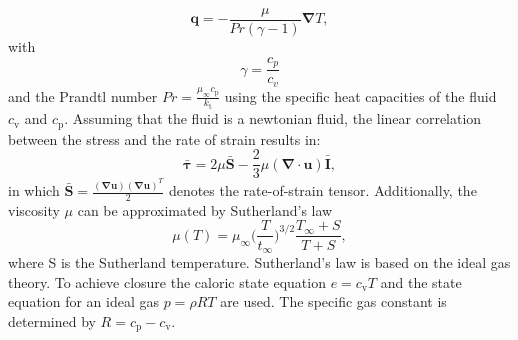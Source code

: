 \documentclass[11pt,a4paper,openany,oneside,parskip=half*]{article}
\renewcommand*\vec[1]{\boldsymbol{#1}}
\renewcommand*\matrix[1]{\boldsymbol{#1}}
\begin{document}
\begin{equation}
 \vec{q} = - \frac{\mu}{Pr (\gamma - 1)} \vec\nabla T,
\end{equation}
with 
\begin{equation}
 \gamma = \frac{c_p}{c_v}
\end{equation}
and the Prandtl number
$ Pr = \frac{\mu_\infty c_\mathrm{p}}{k_\mathrm{t}}$
using the specific heat capacities of the fluid $ c_\mathrm{v} $ and $ c_\mathrm{p} $.
Assuming that the fluid is a newtonian fluid, the linear correlation between the stress and the rate of strain results in:
\begin{equation}
 \matrix{\bar{\tau}} = 2 \mu \matrix{\bar{S}} - \frac{2}{3} \mu (\vec\nabla \cdot \vec{u}) \matrix{\bar{I}},
\end{equation}
in which $ \matrix{\bar{S}} = \frac{(\vec\nabla \vec{u})(\vec\nabla \vec{u})^T}{2} $ denotes the rate-of-strain tensor. Additionally, the viscosity
$ \mu $ can be approximated by Sutherland's law
\begin{equation}
 \mu (T) = \mu_\infty \biggl(\frac{T}{t_\infty}\biggl)^{3/2} \frac{T_\infty + S}{T + S},
\end{equation}
where S is the Sutherland temperature. Sutherland's law is based on the ideal gas theory.
To achieve closure the caloric state equation $ e = c_\mathrm{v} T $ and the state equation for an ideal gas $
p = \rho R T $ are used. The specific gas constant is determined by $ R = c_\mathrm{p} - c_\mathrm{v} $. 
\newline
\end{document}
